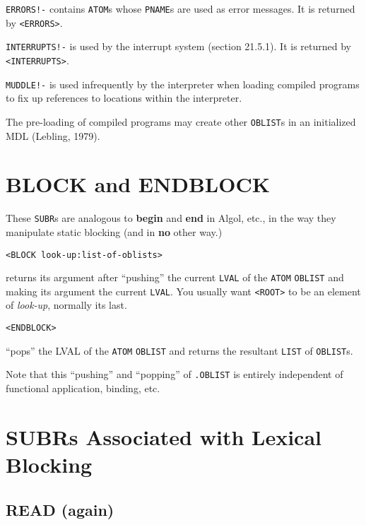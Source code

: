 \documentclass[a4paper]{scrbook}
\begin{document}
\texttt{ERRORS!-} contains \texttt{ATOM}s whose \texttt{PNAME}s are used as error messages. It is returned by
\texttt{\textless{}ERRORS\textgreater{}}.

\texttt{INTERRUPTS!-} is used by the interrupt system (section 21.5.1). It is returned by
\texttt{\textless{}INTERRUPTS\textgreater{}}.

\texttt{MUDDLE!-} is used infrequently by the interpreter when loading compiled programs to
fix up references to locations within the interpreter.

The pre-loading of compiled programs may create other \texttt{OBLIST}s in an initialized MDL (Lebling, 1979).

\section{BLOCK and ENDBLOCK}\label{block-and-endblock}

These \texttt{SUBR}s are analogous to \textbf{begin} and \textbf{end} in Algol, etc., in the way they manipulate static
blocking (and in \textbf{no} other way.)

\begin{verbatim}
<BLOCK look-up:list-of-oblists>
\end{verbatim}

 returns its argument after ``pushing'' the current \texttt{LVAL} of the \texttt{ATOM}
\texttt{OBLIST} and making its argument the current \texttt{LVAL}. You usually want \texttt{\textless{}ROOT\textgreater{}}
to be an element of \emph{look-up}, normally its last.

\begin{verbatim}
<ENDBLOCK>
\end{verbatim}

 ``pops'' the LVAL of the \texttt{ATOM} \texttt{OBLIST} and returns the resultant
\texttt{LIST} of \texttt{OBLIST}s.

Note that this ``pushing'' and ``popping'' of \texttt{.OBLIST} is entirely independent of functional application, binding,
etc.

\section{SUBRs Associated with Lexical Blocking}\label{subrs-associated-with-lexical-blocking}

\subsection{READ (again)}\label{read-again}
\end{document}
